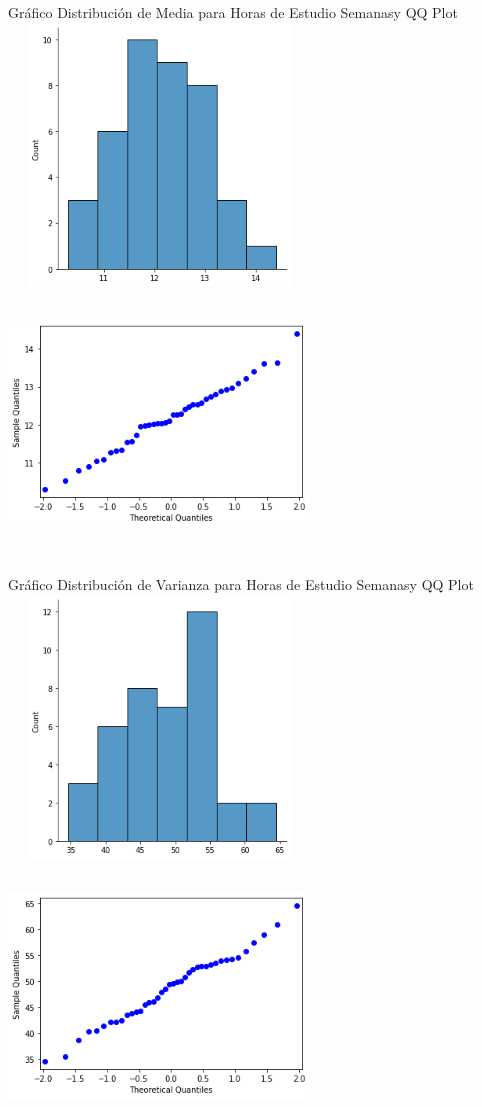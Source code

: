 \documentclass[12pt]{article}
\begin{document}
Gráfico Distribución de Media para Horas de Estudio Semanasy QQ Plot\\
\includegraphics[width=8cm, height=7cm]{horas_histo1}
\includegraphics[width=8cm, height=7cm]{horas_qq1}

Gráfico Distribución de Varianza para Horas de Estudio Semanasy QQ Plot\\
\includegraphics[width=8cm, height=7cm]{horas_histo2}
\includegraphics[width=8cm, height=7cm]{horas_qq2}
\end{document}
